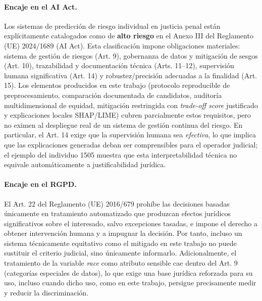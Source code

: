 \documentclass[11pt,a4paper]{article}
\begin{document}
\paragraph{Encaje en el AI Act.} Los sistemas de predicción de riesgo individual en justicia penal están explícitamente catalogados como de \textbf{alto riesgo} en el Anexo III del Reglamento (UE) 2024/1689 (AI Act). Esta clasificación impone obligaciones materiales: sistema de gestión de riesgos (Art. 9), gobernanza de datos y mitigación de sesgos (Art. 10), trazabilidad y documentación técnica (Arts. 11--12), supervisión humana significativa (Art. 14) y robustez/precisión adecuadas a la finalidad (Art. 15). Los elementos producidos en este trabajo (protocolo reproducible de preprocesamiento, comparación documentada de candidatos, auditoría multidimensional de equidad, mitigación restringida con \textit{trade-off score} justificado y explicaciones locales SHAP/LIME) cubren parcialmente estos requisitos, pero no eximen al despliegue real de un sistema de gestión continua del riesgo. En particular, el Art. 14 exige que la supervisión humana sea \emph{efectiva}, lo que implica que las explicaciones generadas deban ser comprensibles para el operador judicial; el ejemplo del individuo 1505 muestra que esta interpretabilidad técnica no equivale automáticamente a justificabilidad jurídica.

\paragraph{Encaje en el RGPD.} El Art. 22 del Reglamento (UE) 2016/679 prohíbe las decisiones basadas únicamente en tratamiento automatizado que produzcan efectos jurídicos significativos sobre el interesado, salvo excepciones tasadas, e impone el derecho a obtener intervención humana y a impugnar la decisión. Por tanto, incluso un sistema técnicamente equitativo como el mitigado en este trabajo no puede sustituir el criterio judicial, sino únicamente informarlo. Adicionalmente, el tratamiento de la variable \textit{race} como atributo sensible cae dentro del Art. 9 (categorías especiales de datos), lo que exige una base jurídica reforzada para su uso, incluso cuando dicho uso, como en este trabajo, persigue precisamente medir y reducir la discriminación.
\end{document}
